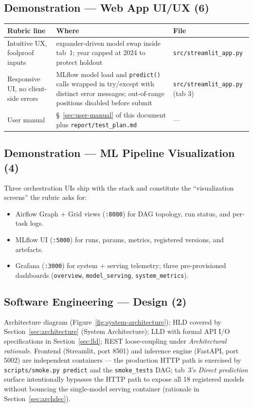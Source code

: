 \documentclass[11pt,a4paper]{article}
\begin{document}
\subsection*{Demonstration --- Web App UI/UX (6)}
\begin{tabularx}{\linewidth}{@{}lXl@{}}
\toprule
\textbf{Rubric line} & \textbf{Where} & \textbf{File} \\
\midrule
Intuitive UX, foolproof inputs        & expander-driven model swap inside tab~1; year capped at 2024 to protect holdout & \texttt{src/streamlit\_app.py} \\
Responsive UI, no client-side errors  & MLflow model load and \texttt{predict()} calls wrapped in try/except with distinct error messages; out-of-range positions disabled before submit & \texttt{src/streamlit\_app.py} (tab 3) \\
User manual                           & \S~\ref{sec:user-manual} of this document plus \texttt{report/test\_plan.md} & --- \\
\bottomrule
\end{tabularx}

\subsection*{Demonstration --- ML Pipeline Visualization (4)}
Three orchestration UIs ship with the stack and constitute the ``visualization screens'' the rubric asks for:
\begin{itemize}[leftmargin=1.5em,itemsep=0pt]
  \item Airflow Graph + Grid views (\texttt{:8080}) for DAG topology, run status, and per-task logs.
  \item MLflow UI (\texttt{:5000}) for runs, params, metrics, registered versions, and artefacts.
  \item Grafana (\texttt{:3000}) for system + serving telemetry; three pre-provisioned dashboards (\texttt{overview}, \texttt{model\_serving}, \texttt{system\_metrics}).
\end{itemize}

\subsection*{Software Engineering --- Design (2)}
Architecture diagram (Figure~\ref{fig:system-architecture}); HLD covered by Section~\ref{sec:architecture} (System Architecture); LLD with formal API I/O specifications in Section~\ref{sec:lld}; REST loose-coupling under \emph{Architectural rationale}. Frontend (Streamlit, port 8501) and inference engine (FastAPI, port 5002) are independent containers --- the production HTTP path is exercised by \texttt{scripts/smoke.py predict} and the \texttt{smoke\_tests} DAG; tab~3's \emph{Direct prediction} surface intentionally bypasses the HTTP path to expose all 18 registered models without bouncing the single-model serving container (rationale in Section~\ref{sec:archdec}).
\end{document}
